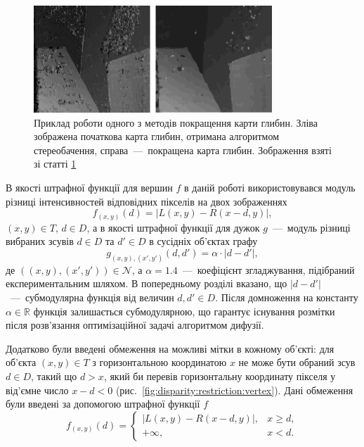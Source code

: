 \begin{figure}[h]
  \centering
  \includegraphics[width=0.8\textwidth]{images/refinement}
  \caption{Приклад роботи одного з методів покращення карти глибин.
           Зліва зображена початкова карта глибин,
           отримана алгоритмом стереобачення, справа~---~покращена карта глибин.
           Зображення взяті зі статті \ref{fig:refinement}}
  \label{fig:refinement}
\end{figure}

В якості штрафної функції для вершин $f$
в даній роботі використовувався модуль різниці
інтенсивностей відповідних пікселів на двох зображеннях
\begin{equation*}
    f_{\left(x, y \right)} \left( d \right) =
    \left| L \left(x, y \right) - R \left(x - d, y \right) \right|,
\end{equation*}
$\left(x, y \right) \in T$, $d \in D$,
а в якості штрафної функції для дужок $g$~---~модуль різниці вибраних зсувів
$d \in D$ та $d' \in D$ в сусідніх об'єктах графу
\begin{equation*}
    g_{\left(x, y \right), \left(x', y' \right)} \left(d, d' \right) =
    \alpha \cdot \left| d - d' \right|,
\end{equation*}
де $\left(\left(x, y \right), \left(x', y' \right) \right) \in \mathcal{N}$,
а $\alpha = 1.4$~---~коефіцієнт згладжування,
підібраний експериментальним шляхом.
В попередньому розділі вказано, що
$\left| d - d' \right|$~---~субмодулярна функція від величин
$d, d' \in D$.
Після домноження на константу $\alpha \in \mathbb{R}$
функція залишається субмодулярною,
що гарантує існування розмітки після розв'язання оптимізаційної задачі
алгоритмом дифузії.

Додатково були введені обмеження на можливі мітки в кожному об'єкті:
для об'єкта $\left( x, y \right) \in T$ з горизонтальною координатою $x$
не може бути обраний зсув $d \in D$, такий що $d > x$,
який би перевів горизонтальну координату пікселя у від'ємне число
$x - d < 0$ (рис.~\ref{fig:disparity:restriction:vertex}).
Дані обмеження були введені за допомогою штрафної функції $f$
\begin{equation*}
    f_{\left(x, y \right)} \left( d \right) =
    \begin{cases}
        \left| L \left(x, y \right) - R \left(x - d, y \right) \right|,
            & x \ge d, \\
        + \infty, & x < d.
    \end{cases}
\end{equation*}

